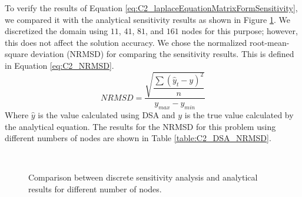To verify the results of Equation \eqref{eq:C2_laplaceEquationMatrixFormSensitivity}, we compared it with the analytical sensitivity results as shown in Figure \ref{fig:C2_discreteSensitivityVerification}. We discretized the domain using $11$, $41$, $81$, and $161$ nodes for this purpose; however, this does not affect the solution accuracy. We chose the normalized root-mean-square deviation (NRMSD) for comparing the sensitivity results. This is defined in Equation \eqref{eq:C2_NRMSD}.
%
\begin{equation}\label{eq:C2_NRMSD}
    NRMSD = \dfrac{\sqrt{\dfrac{\sum (\hat{y}_t - y)^2}{n}}}{y_{max} - y_{min}}
\end{equation}
%
Where $\hat{y}$ is the value calculated using DSA and $y$ is the true value calculated by the analytical equation. The results for the NRMSD for this problem using different numbers of nodes are shown in Table \ref{table:C2_DSA_NRMSD}.
%
\begin{figure}[H]
    \centering
    \quad
    \\
    \quad
    \caption{Comparison between discrete sensitivity analysis and analytical results for different number of nodes.}
    \label{fig:C2_discreteSensitivityVerification}
\end{figure}
